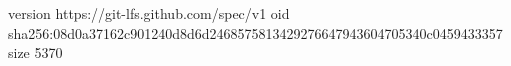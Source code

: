 version https://git-lfs.github.com/spec/v1
oid sha256:08d0a37162c901240d8d6d2468575813429276647943604705340c0459433357
size 5370
